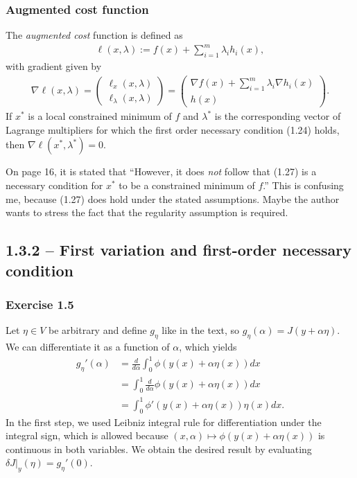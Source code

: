 \documentclass[a4paper]{article}
\begin{document}
\subsubsection*{Augmented cost function}

The \textit{augmented cost} function is defined as
\begin{align*}
  \ell(x,\lambda) := f(x) + \sum_{i=1}^{m} \lambda_{i}h_{i}(x) ,
\end{align*}
with gradient given by
\begin{align*}
  \nabla \ell(x, \lambda) = \begin{pmatrix} \ell_{x}(x, \lambda) \\ \ell_{\lambda}(x, \lambda) \end{pmatrix} = \begin{pmatrix} \nabla f(x) + \sum_{i=1}^{m} \lambda_{i} \nabla h_{i}(x) \\[0.3em] h(x) \end{pmatrix} .
\end{align*}
%
If $x^{*}$ is a local constrained minimum of $f$ and $\lambda^{*}$ is the
corresponding vector of Lagrange multipliers for which the first order necessary
condition (1.24) holds, then $\nabla \ell(x^{*}, \lambda^{*}) = 0$.

On page 16, it is stated that ``However, it does \textit{not} follow that (1.27)
is a necessary condition for $x^{*}$ to be a constrained minimum of $f$.'' This
is confusing me, because (1.27) does hold under the stated assumptions.
Maybe the author wants to stress the fact that the regularity assumption is required.


\subsection*{1.3.2 -- First variation and first-order necessary condition}

\subsubsection*{Exercise 1.5}

Let $\eta \in V$ be arbitrary and define $g_{\eta}$ like in the text, so
$g_{\eta}(\alpha) = J(y + \alpha \eta)$. We can differentiate it as a function of
$\alpha$, which yields
\begin{align*}
  g_{\eta}'(\alpha) &= \frac{d}{d\alpha}  \int_{0}^{1} \phi(y(x) + \alpha \eta(x)) dx \\
  &= \int_{0}^{1} \frac{d}{d\alpha} \phi(y(x) + \alpha \eta(x)) dx  \\
  &= \int_{0}^{1} \phi'(y(x) + \alpha \eta(x)) \eta(x) dx .
\end{align*}
In the first step, we used Leibniz integral rule for differentiation under the integral sign, which is allowed because $(x,\alpha) \mapsto \phi(y(x) + \alpha \eta(x))$ is continuous in both variables.
We obtain the desired result by evaluating $\delta J |_{y}(\eta) = g_{\eta}'(0)$.
\end{document}
